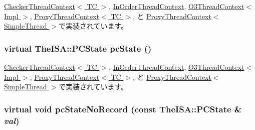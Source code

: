 \hyperlink{classCheckerThreadContext_a5e9cfc754c9ef9b7db875ce89871944e}{CheckerThreadContext$<$ TC $>$}, \hyperlink{classInOrderThreadContext_a5e9cfc754c9ef9b7db875ce89871944e}{InOrderThreadContext}, \hyperlink{classO3ThreadContext_a5e9cfc754c9ef9b7db875ce89871944e}{O3ThreadContext$<$ Impl $>$}, \hyperlink{classProxyThreadContext_a5e9cfc754c9ef9b7db875ce89871944e}{ProxyThreadContext$<$ TC $>$}, と \hyperlink{classProxyThreadContext_a5e9cfc754c9ef9b7db875ce89871944e}{ProxyThreadContext$<$ SimpleThread $>$}で実装されています。\hypertarget{classThreadContext_a1aaca26c0732d2191edbde1477d7ec13}{
\subsubsection[{pcState}]{\setlength{\rightskip}{0pt plus 5cm}virtual TheISA::PCState pcState ()}}
\label{classThreadContext_a1aaca26c0732d2191edbde1477d7ec13}


\hyperlink{classCheckerThreadContext_a827fb3454585cf4c620f4fd341966317}{CheckerThreadContext$<$ TC $>$}, \hyperlink{classInOrderThreadContext_a827fb3454585cf4c620f4fd341966317}{InOrderThreadContext}, \hyperlink{classO3ThreadContext_a0af876e2694c08671975415a22764439}{O3ThreadContext$<$ Impl $>$}, \hyperlink{classProxyThreadContext_a827fb3454585cf4c620f4fd341966317}{ProxyThreadContext$<$ TC $>$}, と \hyperlink{classProxyThreadContext_a827fb3454585cf4c620f4fd341966317}{ProxyThreadContext$<$ SimpleThread $>$}で実装されています。\hypertarget{classThreadContext_aaeee41ee07ac94c41a94512f28a431fa}{
\subsubsection[{pcStateNoRecord}]{\setlength{\rightskip}{0pt plus 5cm}virtual void pcStateNoRecord (const TheISA::PCState \& {\em val})}}
\label{classThreadContext_aaeee41ee07ac94c41a94512f28a431fa}


